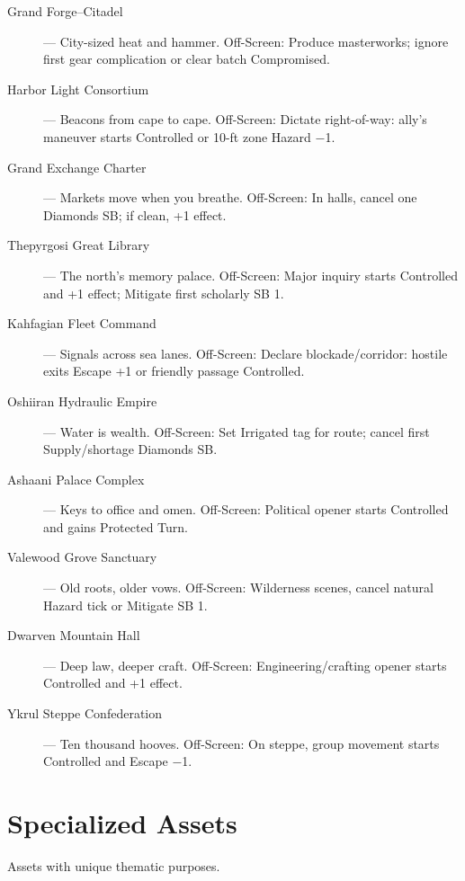 \begin{description}
  \item[Grand Forge–Citadel] — City-sized heat and hammer. Off-Screen: Produce masterworks; ignore first gear complication or clear batch Compromised.
  \item[Harbor Light Consortium] — Beacons from cape to cape. Off-Screen: Dictate right-of-way: ally's maneuver starts Controlled or 10-ft zone Hazard −1.
  \item[Grand Exchange Charter] — Markets move when you breathe. Off-Screen: In halls, cancel one Diamonds SB; if clean, +1 effect.
  \item[Thepyrgosi Great Library] — The north's memory palace. Off-Screen: Major inquiry starts Controlled and +1 effect; Mitigate first scholarly SB 1.
  \item[Kahfagian Fleet Command] — Signals across sea lanes. Off-Screen: Declare blockade/corridor: hostile exits Escape +1 or friendly passage Controlled.
  \item[Oshiiran Hydraulic Empire] — Water is wealth. Off-Screen: Set Irrigated tag for route; cancel first Supply/shortage Diamonds SB.
  \item[Ashaani Palace Complex] — Keys to office and omen. Off-Screen: Political opener starts Controlled and gains Protected Turn.
  \item[Valewood Grove Sanctuary] — Old roots, older vows. Off-Screen: Wilderness scenes, cancel natural Hazard tick or Mitigate SB 1.
  \item[Dwarven Mountain Hall] — Deep law, deeper craft. Off-Screen: Engineering/crafting opener starts Controlled and +1 effect.
  \item[Ykrul Steppe Confederation] — Ten thousand hooves. Off-Screen: On steppe, group movement starts Controlled and Escape −1.
\end{description}

\section{Specialized Assets}

Assets with unique thematic purposes.


